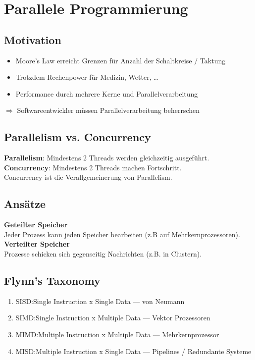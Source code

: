 

\section{Parallele Programmierung}%
\label{pp:sec:parallele-programmierung}

\subsection{Motivation}%
\label{pp:sub:motivation}
\begin{itemize}
  \item Moore's Law erreicht Grenzen für Anzahl der Schaltkreise / Taktung
  \item Trotzdem Rechenpower für Medizin, Wetter, \ldots
  \item Performance durch mehrere Kerne und Parallelverarbeitung
\end{itemize}
\(\Rightarrow\) Softwareentwickler müssen Parallelverarbeitung beherrschen

\subsection{Parallelism vs. Concurrency}%
\label{pp:sub:parallelism-vs-concurrency}
\textbf{Parallelism}: Mindestens 2 Threads werden gleichzeitig ausgeführt.\\
\textbf{Concurrency}: Mindestens 2 Threads machen Fortschritt.\\
Concurrency ist die Verallgemeinerung von Parallelism.

\subsection{Ansätze}%
\label{pp:sub:ansaetze}
\textbf{Geteilter Speicher}\\
Jeder Prozess kann jeden Speicher bearbeiten (z.B auf Mehrkernprozessoren).\\
\textbf{Verteilter Speicher}\\
Prozesse schicken sich gegenseitig Nachrichten (z.B. in Clustern).

\subsection{Flynn's Taxonomy}%
\label{pp:sub:flynns-taxonomy}
\begin{enumerate}
  \item SISD:\@ Single Instruction x Single Data --- von Neumann
  \item SIMD:\@ Single Instruction x Multiple Data --- Vektor Prozessoren
  \item MIMD:\@ Multiple Instruction x Multiple Data --- Mehrkernprozessor
  \item MISD:\@ Multiple Instruction x Single Data --- Pipelines / Redundante Systeme
\end{enumerate}


